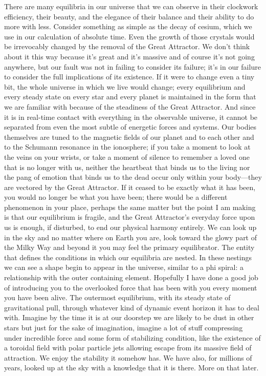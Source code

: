 There are many equilibria in our universe that we can observe in their clockwork efficiency, their beauty, and the elegance of their balance and their ability to do more with less. Consider something as simple as the decay of cesium, which we use in our calculation of absolute time. Even the growth of those crystals would be irrevocably changed by the removal of the Great Attractor. We don’t think about it this way because it’s great and it’s massive and of course it’s not going anywhere, but our fault was not in failing to consider its failure; it’s in our failure to consider the full implications of its existence. If it were to change even a tiny bit, the whole universe in which we live would change; every equilibrium and every steady state on every star and every planet is maintained in the form that we are familiar with because of the steadiness of the Great Attractor. And since it is in real-time contact with everything in the observable universe, it cannot be separated from even the most subtle of energetic forces and systems. Our bodies themselves are tuned to the magnetic fields of our planet and to each other and to the Schumann resonance in the ionosphere; if you take a moment to look at the veins on your wrists, or take a moment of silence to remember a loved one that is no longer with us, neither the heartbeat that binds us to the living nor the pang of emotion that binds us to the dead occur only within your body—they are vectored by the Great Attractor. If it ceased to be exactly what it has been, you would no longer be what you have been; there would be a different phenomenon in your place, perhaps the same matter but the point I am making is that our equilibrium is fragile, and the Great Attractor’s everyday force upon us is enough, if disturbed, to end our physical harmony entirely. We can look up in the sky and no matter where on Earth you are, look toward the glowy part of the Milky Way and beyond it you may feel the primary equilibrator. The entity that defines the conditions in which our equilibria are nested. In these nestings we can see a shape begin to appear in the universe, similar to a phi spiral: a relationship with the outer containing element. Hopefully I have done a good job of introducing you to the overlooked force that has been with you every moment you have been alive. The outermost equilibrium, with its steady state of gravitational pull, through whatever kind of dynamic event horizon it has to deal with. Imagine by the time it is at our doorstep we are likely to be dust in other stars but just for the sake of imagination, imagine a lot of stuff compressing under incredible force and some form of stabilizing condition, like the existence of a toroidal field with polar particle jets allowing escape from its massive field of attraction. We enjoy the stability it somehow has. We have also, for millions of years, looked up at the sky with a knowledge that it is there. More on that later.

